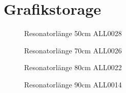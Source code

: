 \documentclass[11pt, a4paper]{article}
\numberwithin{equation}{section}
\begin{document}
\section{Grafikstorage}
\FloatBarrier
\begin{figure}
\centering

\caption{Resonatorlänge 50cm ALL0028}
\label{fig:ALL0028}
\end{figure}
\begin{figure}
\centering

\caption{Resonatorlänge 70cm ALL0026}
\end{figure}
\label{fig:ALL0026}
\begin{figure}
\centering

\caption{Resonatorlänge 80cm ALL0022}
\label{fig:ALL0022}
\end{figure}
\begin{figure}
\centering

\caption{Resonatorlänge 90cm ALL0014}
\label{fig:ALL0014}
\end{figure}
\clearpage
\vspace{\fill}
\end{document}
